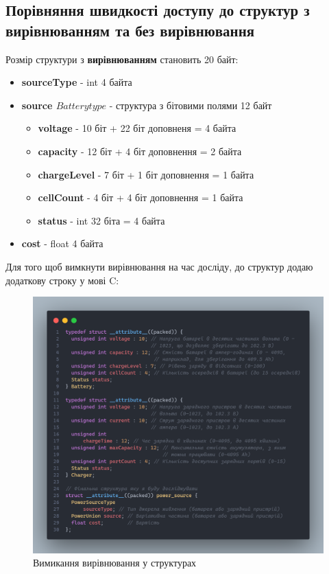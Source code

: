 \clearpage
\subsection{Порівняння швидкості доступу до структур з вирівнюванням та без вирівнювання}
Розмір структури з \textbf{вирівнюванням} становить 20 байт:
\begin{itemize}
    \item \textbf{sourceType} - int 4 байта
    \item \textbf{source \(Battery type\)} - структура з бітовими полями 12 байт
    \begin{itemize}
        \item \textbf{voltage} - 10 біт + 22 біт доповненя = 4 байта
        \item \textbf{capacity} - 12 біт + 4 біт доповнення = 2 байта
        \item \textbf{chargeLevel} - 7 біт + 1 біт доповнення = 1 байта
        \item \textbf{cellCount} - 4 біт + 4 біт доповнення = 1 байта
        \item \textbf{status} - int 32 біта = 4 байта
    \end{itemize}
    \item \textbf{cost} - float 4 байта
\end{itemize}

Для того щоб вимкнути вирівнювання на час досліду, до структур додаю додаткову строку у мові C: 

\begin{figure}[h!]
    \centering
    \includegraphics[width=14cm]{reports/algos/lab4/assets/7.png}
    \caption{Вимикання вирівнювання у структурах}
\end{figure}

